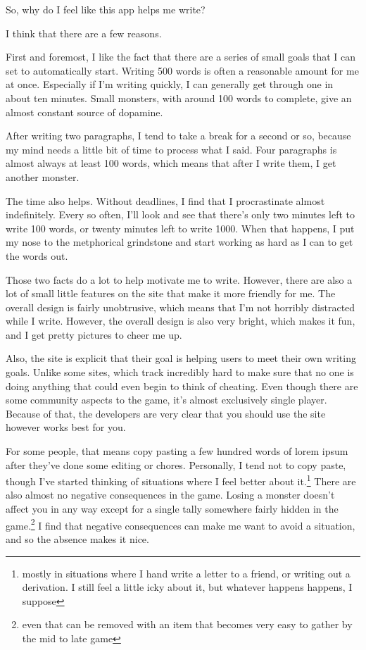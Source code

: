 \documentclass[12pt]{article}[titlepage]
\renewcommand{\,}{\textsuperscript{,}}
\begin{document}
So, why do I feel like this app helps me write?

I think that there are a few reasons.

First and foremost, I like the fact that there are a series of small goals that I can set to automatically start.
Writing 500 words is often a reasonable amount for me at once.
Especially if I'm writing quickly, I can generally get through one in about ten minutes.
Small monsters, with around 100 words to complete, give an almost constant source of dopamine. 

After writing two paragraphs, I tend to take a break for a second or so, because my mind needs a little bit of time to process what I said.
Four paragraphs is almost always at least 100 words, which means that after I write them, I get another monster.

The time also helps.
Without deadlines, I find that I procrastinate almost indefinitely.
Every so often, I'll look and see that there's only two minutes left to write 100 words, or twenty minutes left to write 1000.
When that happens, I put my nose to the metphorical grindstone and start working as hard as I can to get the words out.

Those two facts do a lot to help motivate me to write.
However, there are also a lot of small little features on the site that make it more friendly for me.
The overall design is fairly unobtrusive, which means that I'm not horribly distracted while I write.
However, the overall design is also very bright, which makes it fun, and I get pretty pictures to cheer me up.

Also, the site is explicit that their goal is helping users to meet their own writing goals.
Unlike some sites, which track incredibly hard to make sure that no one is doing anything that could even begin to think of cheating.
Even though there are some community aspects to the game, it's almost exclusively single player.
Because of that, the developers are very clear that you should use the site however works best for you.

For some people, that means copy pasting a few hundred words of lorem ipsum after they've done some editing or chores.
Personally, I tend not to copy paste, though I've started thinking of situations where I feel better about it.\footnote{mostly in situations where I hand write a letter to a friend, or writing out a derivation. I still feel a little icky about it, but whatever happens happens, I suppose}
There are also almost no negative consequences in the game.
Losing a monster doesn't affect you in any way except for a single tally somewhere fairly hidden in the game.\footnote{even that can be removed with an item that becomes very easy to gather by the mid to late game}
I find that negative consequences can make me want to avoid a situation, and so the absence makes it nice.
\end{document}

